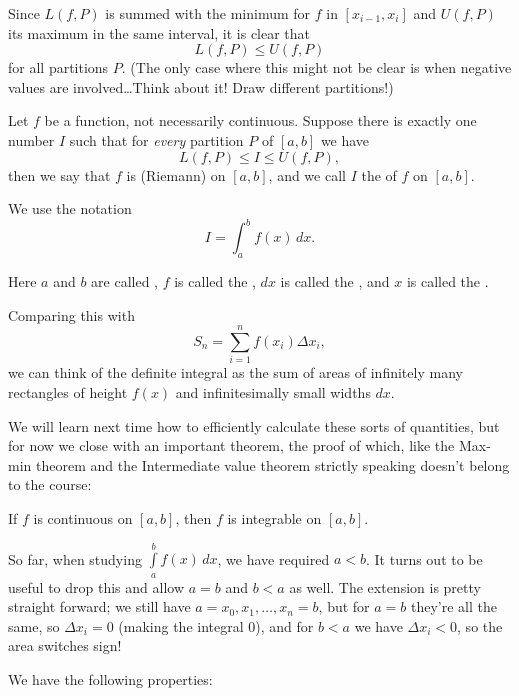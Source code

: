 \noindent
Since $L(f, P)$ is summed with the minimum for $f$ in $[x_{i - 1}, x_i]$ and $U(f, P)$ its maximum in the same interval, it is clear that
\[
	L(f, P) \leq U(f, P)
\]
for all partitions $P$. (The only case where this might not be clear is when negative values are involved\ldots Think about it! Draw different partitions!)

\begin{definition}
	Let $f$ be a function, not necessarily continuous. Suppose there is exactly one number $I$ such that for \emph{every} partition $P$ of $[a, b]$ we have
	\[
		L(f, P) \leq I \leq U(f, P),
	\]
	then we say that $f$ is (Riemann)  on $[a, b]$, and we call $I$ the  of $f$ on $[a, b]$.

	We use the notation
	\[
		I = \int_a^b f(x) \, d x.
	\]

	\noindent
	Here $a$ and $b$ are called , $f$ is called the , $d x$ is called the , and $x$ is called the .
\end{definition}

\noindent
Comparing this with
\[
	S_n = \sum_{i = 1}^n f(x_i) \Delta x_i,
\]
we can think of the definite integral as the sum of areas of infinitely many rectangles of height $f(x)$ and infinitesimally small widths $d x$.

We will learn next time how to efficiently calculate these sorts of quantities, but for now we close with an important theorem, the proof of which, like the Max-min theorem and the Intermediate value theorem strictly speaking doesn't belong to the course:

\begin{theorem}
	If $f$ is continuous on $[a, b]$, then $f$ is integrable on $[a, b]$.
\end{theorem}

\noindent
So far, when studying $\int\limits_a^b f(x) \, d x$, we have required $a < b$. It turns out to be useful to drop this and allow $a = b$ and $b < a$ as well. The extension is pretty straight forward; we still have $a = x_0, x_1, \ldots, x_n = b$, but for $a = b$ they're all the same, so $\Delta x_i = 0$ (making the integral $0$), and for $b < a$ we have $\Delta x_i < 0$, so the area switches sign!

We have the following properties:

